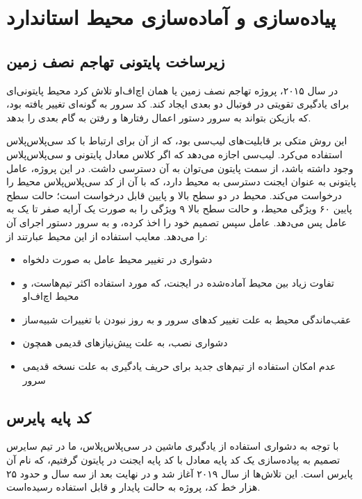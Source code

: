 \chapter{پیاده‌سازی و آماده‌سازی محیط استاندارد}
\section{زیرساخت پایتونی تهاجم نصف زمین}
در سال ۲۰۱۵، 
پروژه تهاجم نصف زمین یا همان اچ‌اف‌او
تلاش کرد محیط پایتونی‌ای برای یادگیری تقویتی در فوتبال دو بعدی ایجاد کند\cite{hausknecht2016half,kalyanakrishnan2007half}.
کد سرور به گونه‌ای تغییر یافته بود، که بازیکن بتواند به سرور دستور اعمال رفتار‌ها و رفتن به گام بعدی را بدهد.

این روش متکی بر قابلیت‌های لیب‌سی بود، که از آن برای ارتباط با کد سی‌پلاس‌پلاس استفاده می‌کرد.
لیب‌سی اجازه می‌دهد که اگر کلاس معادل پایتونی و سی‌پلاس‌پلاس وجود داشته باشد،
از سمت پایتون می‌توان به آن دسترسی داشت.
در این پروژه، عامل پایتونی به عنوان ایجنت دسترسی به محیط دارد، که با آن از کد سی‌پلاس‌پلاس محیط را درخواست می‌کند.
محیط در دو سطح بالا و پایین قابل درخواست است؛ حالت سطح پایین ۶۰ ویژگی محیط، و حالت سطح بالا ۹ ویژگی را به صورت یک آرایه صفر تا یک به عامل پس می‌دهد.
عامل سپس تصمیم خود را اخذ کرده، و به سرور دستور اجرای آن را می‌دهد.
معایب استفاده از این محیط عبارتند از:
\begin{itemize}
    \item دشواری در تغییر محیط عامل به صورت دلخواه
    \item تفاوت زیاد بین محیط آماده‌شده در ایجنت، که مورد استفاده اکثر تیم‌هاست، و محیط اچ‌اف‌او
    \item عقب‌ماندگی محیط به علت تغییر کد‌های سرور و به روز نبودن با تغییرات شبیه‌ساز
    \item دشواری نصب، به علت پیش‌نیاز‌های قدیمی همچون 
    \item عدم امکان استفاده از تیم‌های جدید برای حریف یادگیری به علت نسخه قدیمی سرور
\end{itemize}
\section{کد پایه پایرس}
با توجه به دشواری استفاده از یادگیری ماشین در سی‌پلاس‌پلاس،
ما در تیم سایرس تصمیم به پیاده‌سازی یک کد پایه معادل با کد پایه ایجنت
در پایتون گرفتیم، که نام آن پایرس است\cite{zare2023pyrus}.
این تلاش‌ها از سال ۲۰۱۹ آغاز شد و در نهایت بعد از سه سال و حدود ۲۵ هزار خط کد، پروژه به حالت پایدار و قابل استفاده رسیده‌است.

